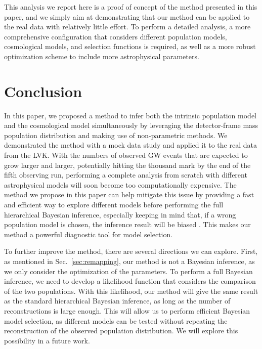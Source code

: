 \documentclass[sn-aps, pdflatex, iicol]{sn-jnl}
\begin{document}
This analysis we report here is a proof of concept of the method presented in this paper, and we simply aim at demonstrating that our method can be applied to the real data with relatively little effort.
To perform a detailed analysis, a more comprehensive configuration that considers different population models, cosmological models, and selection functions is required, as well as a more robust optimization scheme to include more astrophysical parameters.

\section{Conclusion}
\label{sec:conclusion}

In this paper, we proposed a method to infer both the intrinsic population model and the cosmological model simultaneously by leveraging the detector-frame mass population distribution and making use of non-parametric methods.
We demonstrated the method with a mock data study and applied it to the real data from the \ac{LVK}.
With the numbers of observed \ac{GW} events that are expected to grow larger and larger, potentially hitting the thousand mark by the end of the fifth observing run, performing a complete analysis from scratch with different astrophysical models will soon become too computationally expensive.
The method we propose in this paper can help mitigate this issue by providing a fast and efficient way to explore different models before performing the full hierarchical Bayesian inference, especially keeping in mind that, if a wrong population model is chosen, the inference result will be biased \citep{Mukherjee:2021rtw, Mastrogiovanni:2021wsd, Pierra:2023deu, LIGOScientific:2020kqk, KAGRA:2021duu}.
This makes our method a powerful diagnostic tool for model selection.

To further improve the method, there are several directions we can explore.
First, as mentioned in Sec.~\ref{sec:remapping}, our method is not a Bayesian inference, as we only consider the optimization of the parameters.
To perform a full Bayesian inference, we need to develop a likelihood function that considers the comparison of the two populations.
With this likelihood, our method will give the same result as the standard hierarchical Bayesian inference, as long as the number of reconstructions is large enough.
This will allow us to perform efficient Bayesian model selection, as different models can be tested without repeating the reconstruction of the observed population distribution.
We will explore this possibility in a future work.
\end{document}
